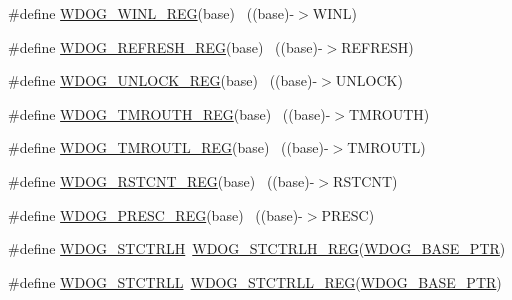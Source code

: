 \begin{DoxyCompactItemize}
\item 
\#define \hyperlink{group___w_d_o_g___register___accessor___macros_ga7d3de8371302abe17948011dd6ae8522}{W\+D\+O\+G\+\_\+\+W\+I\+N\+L\+\_\+\+R\+EG}(base)                                        ~((base)-\/$>$W\+I\+NL)
\item 
\#define \hyperlink{group___w_d_o_g___register___accessor___macros_ga706e227590678130bb2b7fc04e0263d1}{W\+D\+O\+G\+\_\+\+R\+E\+F\+R\+E\+S\+H\+\_\+\+R\+EG}(base)                                  ~((base)-\/$>$R\+E\+F\+R\+E\+SH)
\item 
\#define \hyperlink{group___w_d_o_g___register___accessor___macros_ga0424f1f517c5ed49f00c67fc4454bba5}{W\+D\+O\+G\+\_\+\+U\+N\+L\+O\+C\+K\+\_\+\+R\+EG}(base)                                    ~((base)-\/$>$U\+N\+L\+O\+CK)
\item 
\#define \hyperlink{group___w_d_o_g___register___accessor___macros_ga6c5cca0fc2aeec6d1f8808f55c57acbb}{W\+D\+O\+G\+\_\+\+T\+M\+R\+O\+U\+T\+H\+\_\+\+R\+EG}(base)                                  ~((base)-\/$>$T\+M\+R\+O\+U\+TH)
\item 
\#define \hyperlink{group___w_d_o_g___register___accessor___macros_gaed1d5071ac9fb7f531fdda660780a329}{W\+D\+O\+G\+\_\+\+T\+M\+R\+O\+U\+T\+L\+\_\+\+R\+EG}(base)                                  ~((base)-\/$>$T\+M\+R\+O\+U\+TL)
\item 
\#define \hyperlink{group___w_d_o_g___register___accessor___macros_ga321d566d296ee323809e242077a1c776}{W\+D\+O\+G\+\_\+\+R\+S\+T\+C\+N\+T\+\_\+\+R\+EG}(base)                                    ~((base)-\/$>$R\+S\+T\+C\+NT)
\item 
\#define \hyperlink{group___w_d_o_g___register___accessor___macros_gacbfa99926928928f05da2e4c752ea945}{W\+D\+O\+G\+\_\+\+P\+R\+E\+S\+C\+\_\+\+R\+EG}(base)                                      ~((base)-\/$>$P\+R\+E\+SC)
\item 
\#define \hyperlink{group___w_d_o_g___register___accessor___macros_ga682e2c5e771ae99e572597d5a9ee8620}{W\+D\+O\+G\+\_\+\+S\+T\+C\+T\+R\+LH}~\hyperlink{group___w_d_o_g___register___accessor___macros_gafe3961a26965f4d22fa82eb4a6906efa}{W\+D\+O\+G\+\_\+\+S\+T\+C\+T\+R\+L\+H\+\_\+\+R\+EG}(\hyperlink{group___w_d_o_g___peripheral_ga72fb27c7bc1ae124f180d8f2c7b9fa79}{W\+D\+O\+G\+\_\+\+B\+A\+S\+E\+\_\+\+P\+TR})
\item 
\#define \hyperlink{group___w_d_o_g___register___accessor___macros_gabe98a0873c234c1297e69e1cfb7ebb9e}{W\+D\+O\+G\+\_\+\+S\+T\+C\+T\+R\+LL}~\hyperlink{group___w_d_o_g___register___accessor___macros_gab5f636177e7295761f4d366fc6f2d9c5}{W\+D\+O\+G\+\_\+\+S\+T\+C\+T\+R\+L\+L\+\_\+\+R\+EG}(\hyperlink{group___w_d_o_g___peripheral_ga72fb27c7bc1ae124f180d8f2c7b9fa79}{W\+D\+O\+G\+\_\+\+B\+A\+S\+E\+\_\+\+P\+TR})

\end{DoxyCompactItemize}
